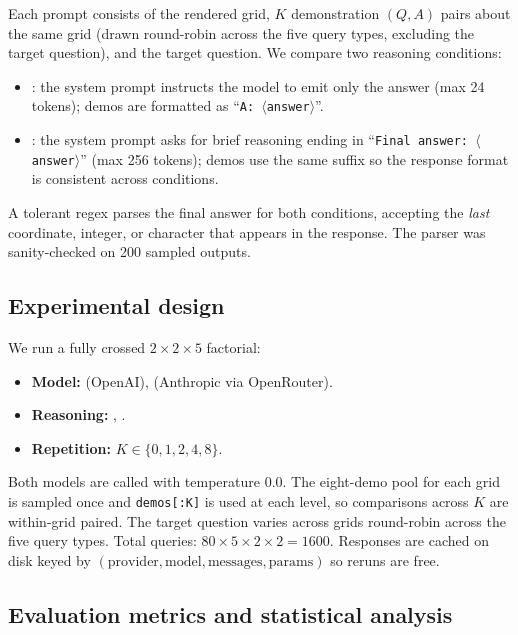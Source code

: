 Each prompt consists of the rendered grid, $K$ demonstration
$(Q, A)$ pairs about the same grid (drawn round-robin across the five
query types, excluding the target question), and the target question.
We compare two reasoning conditions:
\begin{itemize}[leftmargin=*,itemsep=0pt,topsep=0pt]
    \item \Direct: the system prompt instructs the model to emit only
    the answer (max 24 tokens); demos are formatted as
    ``\texttt{A: $\langle$answer$\rangle$}''.
    \item \COT: the system prompt asks for brief reasoning ending in
    ``\texttt{Final answer: $\langle$answer$\rangle$}'' (max 256
    tokens); demos use the same suffix so the response format is
    consistent across conditions.
\end{itemize}
A tolerant regex parses the final answer for both conditions, accepting
the \emph{last} coordinate, integer, or character that appears in the
response. The parser was sanity-checked on 200 sampled outputs.

\subsection{Experimental design}

We run a fully crossed $2 \times 2 \times 5$ factorial:
\begin{itemize}[leftmargin=*,itemsep=0pt,topsep=0pt]
    \item \textbf{Model:} \gpt (OpenAI), \haiku (Anthropic via OpenRouter).
    \item \textbf{Reasoning:} \Direct, \COT.
    \item \textbf{Repetition:} $K \in \{0, 1, 2, 4, 8\}$.
\end{itemize}
Both models are called with temperature 0.0. The eight-demo pool for
each grid is sampled once and \texttt{demos[:K]} is used at each level,
so comparisons across $K$ are within-grid paired. The target
question varies across grids round-robin across the five query types.
Total queries: $80 \times 5 \times 2 \times 2 = 1600$. Responses are
cached on disk keyed by $(\text{provider}, \text{model},
\text{messages}, \text{params})$ so reruns are free.

\subsection{Evaluation metrics and statistical analysis}

